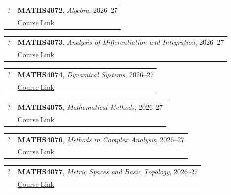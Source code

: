 \documentclass[12pt]{article}
\begin{document}
\begin{itemize}[leftmargin = *]
        \begin{tabularx}{\textwidth}{@{}lX@{}}
            ? & \textbf{MATHS4072}, \textit{Algebra}, 2026--27
            \\
            &
            \href{https://www.gla.ac.uk/coursecatalogue/course/?code=MATHS4072}{Course Link} \\
        \end{tabularx}


        \begin{tabularx}{\textwidth}{@{}lX@{}}
            ? & \textbf{MATHS4073}, \textit{Analysis of Differentiation and Integration}, 2026--27
            \\
            &
            \href{https://www.gla.ac.uk/coursecatalogue/course/?code=MATHS4073}{Course Link} \\
        \end{tabularx}


        \begin{tabularx}{\textwidth}{@{}lX@{}}
            ? & \textbf{MATHS4074}, \textit{Dynamical Systems}, 2026--27
            \\
            &
            \href{https://www.gla.ac.uk/coursecatalogue/course/?code=MATHS4074}{Course Link} \\
        \end{tabularx}


        \begin{tabularx}{\textwidth}{@{}lX@{}}
            ? & \textbf{MATHS4075}, \textit{Mathematical Methods}, 2026--27
            \\
            &
            \href{https://www.gla.ac.uk/coursecatalogue/course/?code=MATHS4075}{Course Link} \\
        \end{tabularx}


        \begin{tabularx}{\textwidth}{@{}lX@{}}
            ? & \textbf{MATHS4076}, \textit{Methods in Complex Analysis}, 2026--27
            \\
            &
            \href{https://www.gla.ac.uk/coursecatalogue/course/?code=MATHS4076}{Course Link} \\
        \end{tabularx}


        \begin{tabularx}{\textwidth}{@{}lX@{}}
            ? & \textbf{MATHS4077}, \textit{Metric Spaces and Basic Topology}, 2026--27
            \\
            &
            \href{https://www.gla.ac.uk/coursecatalogue/course/?code=MATHS4077}{Course Link} \\
        \end{tabularx}



\end{itemize}
\end{document}
